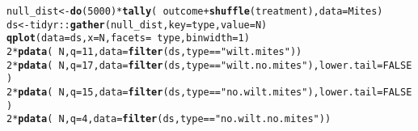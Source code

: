 \documentclass[10pt]{article}\usepackage[]{graphicx}\usepackage[]{color}
\makeatletter
\newcommand{\hlnum}[1]{\textcolor[rgb]{0.686,0.059,0.569}{#1}}%
\newcommand{\hlstr}[1]{\textcolor[rgb]{0.192,0.494,0.8}{#1}}%
\newcommand{\hlopt}[1]{\textcolor[rgb]{0,0,0}{#1}}%
\newcommand{\hlstd}[1]{\textcolor[rgb]{0.345,0.345,0.345}{#1}}%
\newcommand{\hlkwb}[1]{\textcolor[rgb]{0.69,0.353,0.396}{#1}}%
\newcommand{\hlkwc}[1]{\textcolor[rgb]{0.333,0.667,0.333}{#1}}%
\newcommand{\hlkwd}[1]{\textcolor[rgb]{0.737,0.353,0.396}{\textbf{#1}}}%
\newenvironment{kframe}{%
 \def\at@end@of@kframe{}%
 \ifinner\ifhmode%
  \def\at@end@of@kframe{\end{minipage}}%
  \begin{minipage}{\columnwidth}%
 \fi\fi%
 \def\FrameCommand##1{\hskip\@totalleftmargin \hskip-\fboxsep
 \colorbox{shadecolor}{##1}\hskip-\fboxsep
     \hskip-\linewidth \hskip-\@totalleftmargin \hskip\columnwidth}%
 \MakeFramed {\advance\hsize-\width
   \@totalleftmargin\z@ \linewidth\hsize
   \@setminipage}}%
 {\par\unskip\endMakeFramed%
 \at@end@of@kframe}
\newenvironment{knitrout}{}{} %
\makeatother
\begin{document}
\begin{knitrout}
\color{fgcolor}\begin{kframe}
\begin{alltt}
\hlstd{null_dist} \hlkwb{<-} \hlkwd{do}\hlstd{(}\hlnum{5000}\hlstd{)} \hlopt{*} \hlkwd{tally}\hlstd{(}\hlopt{~} \hlstd{outcome} \hlopt{+} \hlkwd{shuffle}\hlstd{(treatment),} \hlkwc{data} \hlstd{= Mites)}
\hlstd{ds} \hlkwb{<-} \hlstd{tidyr}\hlopt{::}\hlkwd{gather}\hlstd{(null_dist,} \hlkwc{key} \hlstd{= type,} \hlkwc{value} \hlstd{= N)}
\hlkwd{qplot}\hlstd{(}\hlkwc{data} \hlstd{= ds,} \hlkwc{x} \hlstd{= N,} \hlkwc{facets} \hlstd{=} \hlopt{~}\hlstd{type,} \hlkwc{binwidth} \hlstd{=} \hlnum{1}\hlstd{)}
\hlnum{2} \hlopt{*} \hlkwd{pdata}\hlstd{(}\hlopt{~}\hlstd{N,} \hlkwc{q} \hlstd{=} \hlnum{11}\hlstd{,} \hlkwc{data} \hlstd{=} \hlkwd{filter}\hlstd{(ds, type} \hlopt{==} \hlstr{"wilt.mites"}\hlstd{))}
\hlnum{2} \hlopt{*} \hlkwd{pdata}\hlstd{(}\hlopt{~}\hlstd{N,} \hlkwc{q} \hlstd{=} \hlnum{17}\hlstd{,} \hlkwc{data} \hlstd{=} \hlkwd{filter}\hlstd{(ds, type} \hlopt{==} \hlstr{"wilt.no.mites"}\hlstd{),} \hlkwc{lower.tail} \hlstd{=} \hlnum{FALSE}\hlstd{)}
\hlnum{2} \hlopt{*} \hlkwd{pdata}\hlstd{(}\hlopt{~}\hlstd{N,} \hlkwc{q} \hlstd{=} \hlnum{15}\hlstd{,} \hlkwc{data} \hlstd{=} \hlkwd{filter}\hlstd{(ds, type} \hlopt{==} \hlstr{"no.wilt.mites"}\hlstd{),} \hlkwc{lower.tail} \hlstd{=} \hlnum{FALSE}\hlstd{)}
\hlnum{2} \hlopt{*} \hlkwd{pdata}\hlstd{(}\hlopt{~}\hlstd{N,} \hlkwc{q} \hlstd{=} \hlnum{4}\hlstd{,} \hlkwc{data} \hlstd{=} \hlkwd{filter}\hlstd{(ds, type} \hlopt{==} \hlstr{"no.wilt.no.mites"}\hlstd{))}
\end{alltt}
\end{kframe}
\end{knitrout}
\end{document}
